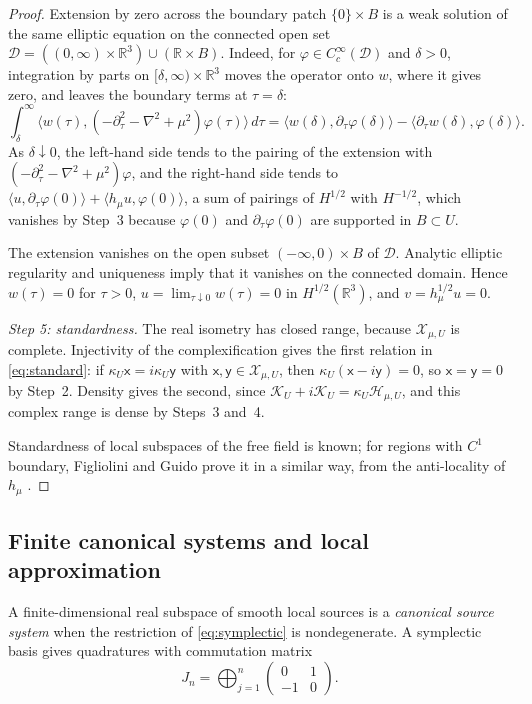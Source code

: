 \documentclass[11pt]{amsart}
\numberwithin{equation}{section}
\theoremstyle{definition}
\newcommand{\R}{\mathbb R}
\newcommand{\Hh}{\mathcal H}
\newcommand{\sx}{\mathsf x}
\newcommand{\sy}{\mathsf y}
\newcommand{\ip}[2]{\langle #1,#2\rangle}
\begin{document}
\begin{proof}
Extension by
zero across the boundary patch \(\{0\}\times B\) is a weak solution of the same elliptic
equation on the connected open set
\(\mathcal D=((0,\infty)\times\R^3)\cup(\R\times B)\). Indeed, for
\(\varphi\in C_c^\infty(\mathcal D)\) and \(\delta>0\), integration by
parts on \([\delta,\infty)\times\R^3\) moves the operator onto \(w\),
where it gives zero, and leaves the boundary terms at \(\tau=\delta\):
\[
 \int_\delta^\infty
 \ip{w(\tau)}{(-\partial_\tau^2-\nabla^2+\mu^2)\varphi(\tau)}\,d\tau
 =\ip{w(\delta)}{\partial_\tau\varphi(\delta)}
 -\ip{\partial_\tau w(\delta)}{\varphi(\delta)}.
\]
As \(\delta\downarrow0\), the left-hand side tends to the pairing of the
extension with \((-\partial_\tau^2-\nabla^2+\mu^2)\varphi\), and the
right-hand side tends to
\(\ip{u}{\partial_\tau\varphi(0)}+\ip{h_\mu u}{\varphi(0)}\), a sum of
pairings of \(H^{1/2}\) with \(H^{-1/2}\), which vanishes by Step~3
because \(\varphi(0)\) and \(\partial_\tau\varphi(0)\) are supported in
\(B\subset U\).

The extension vanishes on the open subset
\((-\infty,0)\times B\) of \(\mathcal D\). Analytic elliptic regularity
and uniqueness \cite{Hormander03} imply that it vanishes on the
connected domain. Hence \(w(\tau)=0\) for \(\tau>0\),
\(u=\lim_{\tau\downarrow0}w(\tau)=0\) in \(H^{1/2}(\R^3)\), and
\(v=h_\mu^{1/2}u=0\).

\smallskip
\emph{Step 5: standardness.} The real isometry has closed range,
because \(\mathcal X_{\mu,U}\) is complete. Injectivity of the
complexification gives the first relation in \eqref{eq:standard}: if
\(\kappa_U\sx=i\kappa_U\sy\) with \(\sx,\sy\in\mathcal X_{\mu,U}\), then
\(\kappa_U(\sx-i\sy)=0\), so \(\sx=\sy=0\) by Step~2. Density gives the
second, since \(\mathcal K_U+i\mathcal K_U=\kappa_U\Hh_{\mu,U}\), and
this complex range is dense by Steps~3 and~4.

Standardness of local subspaces of the free field is known; for
regions with \(C^1\) boundary, Figliolini and Guido prove it in a similar
way, from the anti-locality of \(h_\mu\)
\cite[Propositions~2.4 and~2.7]{FG89}.
\end{proof}

\subsection{Finite canonical systems and local approximation}

A finite-dimensional real subspace of smooth local sources is a
\emph{canonical source system} when the restriction of
\eqref{eq:symplectic} is nondegenerate. A symplectic basis gives
quadratures with commutation matrix
\[
 J_n=\bigoplus_{j=1}^n
 \begin{pmatrix}0&1\\-1&0\end{pmatrix}.
\]
\end{document}
